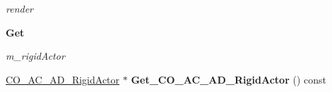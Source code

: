 \begin{DoxyCompactItemize}
\begin{DoxyCompactList}\small\item\em render \item\end{DoxyCompactList}\end{DoxyCompactItemize}
\begin{Indent}{\bf Get}\par
{\em \label{_amgrpc55582518cba2c464f29f5bae1c68def}
 m\_\-rigidActor }\begin{DoxyCompactItemize}
\item 
\hypertarget{classContent_1_1Shape_1_1Admin_1_1Shape_a9e24c8b23ed48313bfed755790a5e655}{
\hyperlink{classContent_1_1Actor_1_1Admin_1_1RigidActor}{CO\_\-AC\_\-AD\_\-RigidActor} $\ast$ {\bfseries Get\_\-CO\_\-AC\_\-AD\_\-RigidActor} () const }
\label{classContent_1_1Shape_1_1Admin_1_1Shape_a9e24c8b23ed48313bfed755790a5e655}

\end{DoxyCompactItemize}
\end{Indent}

